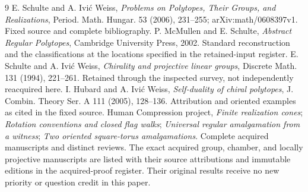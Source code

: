 \documentclass[11pt,a4paper]{article}
\begin{document}
\begin{thebibliography}{9}\small
{} E. Schulte and A. Ivi\'c Weiss,
\emph{Problems on Polytopes, Their Groups, and Realizations},
Period. Math. Hungar. 53 (2006), 231--255;
arXiv:math/0608397v1. Fixed source and complete bibliography.
 P. McMullen and E. Schulte,
\emph{Abstract Regular Polytopes}, Cambridge University
Press, 2002. Standard reconstruction and the classifications
at the locations specified in the retained-input register.
 E. Schulte and A. Ivi\'c Weiss,
\emph{Chirality and projective linear groups}, Discrete
Math. 131 (1994), 221--261. Retained through the
inspected survey, not independently reacquired here.
 I. Hubard and A. Ivi\'c Weiss,
\emph{Self-duality of chiral polytopes}, J. Combin.
Theory Ser. A 111 (2005), 128--136. Attribution and
oriented examples as cited in the fixed source.
 Human Compression project,
\emph{Finite realization cones};
\emph{Rotation conventions and closed flag walks};
\emph{Universal regular amalgamation from a witness};
\emph{Two oriented square-torus amalgamations}.
Complete acquired manuscripts and distinct reviews.
 The exact acquired group, chamber,
and locally projective manuscripts are listed with their
source attributions and immutable editions in the
acquired-proof register. Their original results receive
no new priority or question credit in this paper.
\end{thebibliography}
\end{document}
